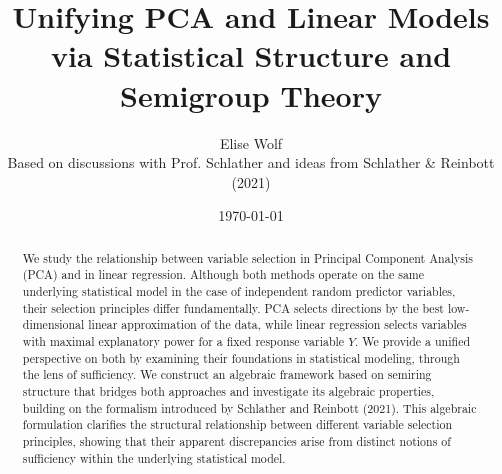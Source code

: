\documentclass{article}
\title{Unifying PCA and Linear Models via Statistical Structure and Semigroup Theory}
\author{Elise Wolf \\ Based on discussions  with Prof. Schlather and ideas from Schlather \& Reinbott (2021)}
\date{\today}
\theoremstyle{definition}
\begin{document}
\maketitle

\begin{abstract}

We study the relationship between variable selection in Principal Component Analysis (PCA) and in linear regression. Although both methods operate on the same underlying statistical model in the case of independent random predictor variables, their selection principles differ fundamentally. PCA selects directions by the best low-dimensional linear approximation of the data, while linear regression selects variables with maximal explanatory power for a fixed response variable $Y$. We provide a unified perspective on both by examining their foundations in statistical modeling, through the lens of sufficiency. We construct an algebraic framework based on semiring structure that bridges both approaches and investigate its algebraic properties, building on the formalism introduced by Schlather and Reinbott (2021). This algebraic formulation clarifies the structural relationship between different variable selection principles, showing that their apparent discrepancies arise from distinct notions of sufficiency within the underlying statistical model.
\end{abstract}

\tableofcontents
















\newpage












\end{document}
